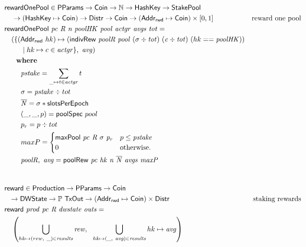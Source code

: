 \begin{figure}[htb]
  \begin{align*}
      & \fun{rewardOnePool} \in \PParams \to \Coin \to \mathbb{N} \to \HashKey \to \StakePool\\
      & ~~~\to (\HashKey \mapsto \Coin)\to \Distr \to \Coin \to (\AddrRWD \mapsto \Coin)\times[0, 1]
      & \text{reward one pool} \\
      & \fun{rewardOnePool}~\var{pc}~\var{R}~\var{n}~\var{poolHK}~\var{pool}
        ~\var{actgr}~\var{avgs}~\var{tot} = \\
      & ~~~(\{ (\AddrRWD~hk)\mapsto ( \fun{indivRew}~\var{poolR}~\var{pool}
                                 ~(\sigma\div\var{tot})~(\var{c}\div\var{tot})~(hk ==\var{poolHK})) \\
      & ~~~~~~~\mid hk\mapsto c\in\var{actgr}\},~\var{avg})\\
      & ~~~\where \\
      & ~~~~~~~\var{pstake} = \sum_{\_\mapsto t\in\var{actgr}} t \\
      & ~~~~~~~\sigma = \var{pstake} \div tot \\
      & ~~~~~~~\var{\overline{N}} = \sigma * \slotsPer\\
      & ~~~~~~~(\_, \_, p) = \fun{poolSpec}~pool \\
      & ~~~~~~~p_{r} = p \div tot \\
      & ~~~~~~~maxP =
      \begin{cases}
          \fun{maxPool}~\var{pc}~\var{R}~\sigma~\var{p_r}&
              p \leq \var{pstake}\\
          0 & \text{otherwise.}
        \end{cases} \\
      & ~~~~~~~\var{poolR},~\var{avg} = \fun{poolRew}~\var{pc}~\var{hk}~\var{n}~\var{\overline{N}}~\var{avgs}~\var{maxP} \\
      \nextdef
      & \fun{reward} \in \Production \to \PParams \to \Coin \\
      & ~~ \to \DWState \to \powerset{\TxOut} \to (\AddrRWD \mapsto \Coin)\times\Distr
      & \text{staking rewards} \\
      & \fun{reward}~\var{prod}~\var{pc}~\var{R}~\var{dwstate}~\var{outs} = \\
      & ~~~\left(
           \bigcup_{hk\mapsto(rew,~\_)\in\var{results}} \var{rew},
           ~~\bigcup_{hk\mapsto(\_,~\var{avg})\in\var{results}} hk\mapsto\var{avg}
           \right)\\

\end{align*}
\end{figure}
